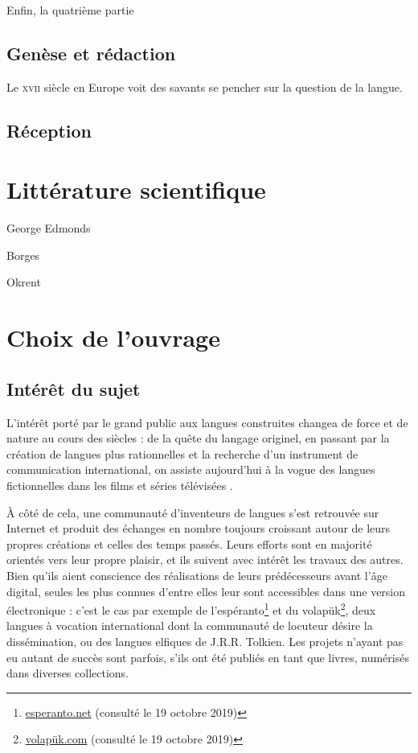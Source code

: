 Enfin, la quatrième partie

\subsection{Genèse et rédaction}
Le \textsc{xvii}\ieme{} siècle en Europe voit des savants se pencher sur la question de la langue.

\subsection{Réception}
\section{Littérature scientifique}\label{WilkinsLitt}
George Edmonds

Borges

Okrent
\section{Choix de l'ouvrage}\label{WilkinsChoix}
\subsection{Intérêt du sujet}
L'intérêt porté par le grand public aux langues construites changea de force et de nature au cours des siècles : de la quête du langage originel, en passant par la création de langues plus rationnelles et la recherche d'un instrument de communication international, on assiste aujourd'hui à la vogue des langues fictionnelles dans les films et séries télévisées \parencite{huchelmann_les_2019}.

À côté de cela, une communauté d'inventeurs de langues s'est retrouvée sur Internet et produit des échanges en nombre toujours croissant autour de leurs propres créations et celles des temps passés.
Leurs efforts sont en majorité orientés vers leur propre plaisir, et ils suivent avec intérêt les travaux des autres.
Bien qu'ils aient conscience des réalisations de leurs prédécesseurs avant l'âge digital, seules les plus connues d'entre elles leur sont accessibles dans une version électronique : c'est le cas par exemple de l'espéranto\footnote{\url{esperanto.net} (consulté le 19 octobre 2019)} et du volapük\footnote{\url{volapük.com} (consulté le 19 octobre 2019)}, deux langues à vocation international dont la communauté de locuteur désire la dissémination, ou des langues elfiques de J.R.R. Tolkien.
Les projets n'ayant pas eu autant de succès sont parfois, s'ils ont été publiés en tant que livres, numérisés dans diverses collections.




